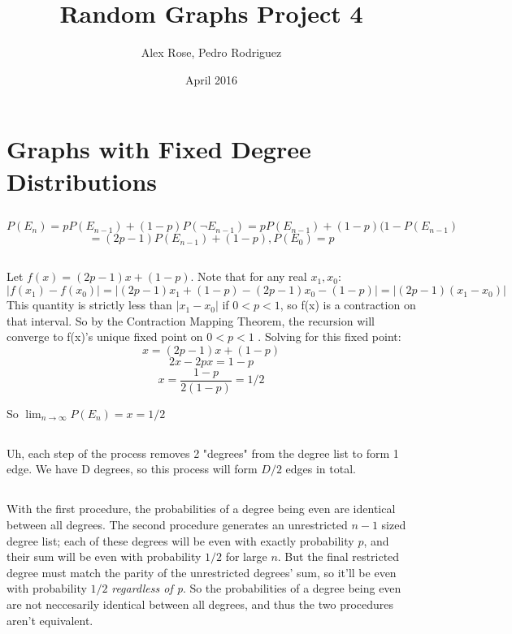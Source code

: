 \documentclass{article}
\title{Random Graphs Project 4}
\author{Alex Rose, Pedro Rodriguez}
\date{April 2016}
\begin{document}
\maketitle

\section{ Graphs with Fixed Degree Distributions}

\subsection{ }

$$P(E_n) = pP(E_{n-1}) + (1-p)P(\neg E_{n-1}) = pP(E_{n-1}) + (1-p)(1- P(E_{n-1}) $$
$$ = (2p-1)P(E_{n-1}) + (1 - p), P(E_0) = p$$

\subsection{} 
Let $f(x) = (2p -1)x + (1-p)$. Note that for any real $x_1,x_0$:
$$|f(x_1) - f(x_0)| = |(2p-1)x_1 + (1-p) - (2p-1)x_0 - (1-p)| = |(2p-1)(x_1-x_0)|$$
This quantity is strictly less than $|x_1-x_0|$ if $0 < p < 1$, so f(x) is a contraction on that interval. So by the Contraction Mapping Theorem, the recursion will converge to f(x)'s unique fixed point on $0 < p < 1$ .  Solving for this fixed point:
$$x = (2p-1)x + (1-p)$$
$$2x - 2px = 1-p$$
$$x = \frac{1-p}{2(1-p)} = 1/2$$

So $\lim_{n\to\infty} P(E_{n})= x = 1/2$

\subsection{}
Uh, each step of the process removes 2 "degrees" from the degree list to form 1 edge. We have D degrees, so this process will form $D/2$ edges in total.

\subsection{}
With the first procedure, the probabilities of a degree being even are identical between all degrees. The second procedure generates an unrestricted $n-1$ sized degree list; each of these degrees will be even with exactly probability $p$, and their sum will be even with probability $1/2$ for large $n$. But the final restricted degree must match the parity of the unrestricted degrees' sum, so it'll be even with probability $1/2$ \textit{regardless of p}. So the probabilities of a degree being even are not neccesarily identical between all degrees, and thus the two procedures aren't equivalent. 
\end{document}
